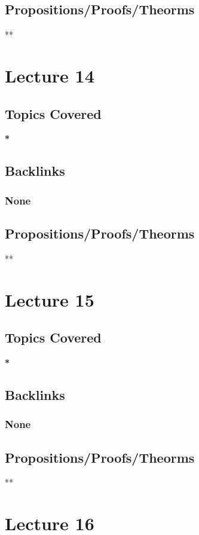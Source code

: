 \documentclass[11pt]{article}
\begin{document}
\subsection*{Propositions/Proofs/Theorms}
\label{sec:org3b6b90b}
**

\section*{Lecture 14}
\label{sec:orge2b2d7a}
\subsection*{Topics Covered}
\label{sec:org660921d}
\textbf{*}
\subsection*{Backlinks}
\label{sec:org1646d88}
\subsubsection*{None}
\label{sec:orge9ef40d}
\subsection*{Propositions/Proofs/Theorms}
\label{sec:org9795afc}
**

\section*{Lecture 15}
\label{sec:orgeee6f7f}
\subsection*{Topics Covered}
\label{sec:orgf8ee289}
\textbf{*}
\subsection*{Backlinks}
\label{sec:org22f2e44}
\subsubsection*{None}
\label{sec:orgc0e65a3}
\subsection*{Propositions/Proofs/Theorms}
\label{sec:orgba9a26a}
**

\section*{Lecture 16}
\label{sec:org8edc7a0}
\end{document}
